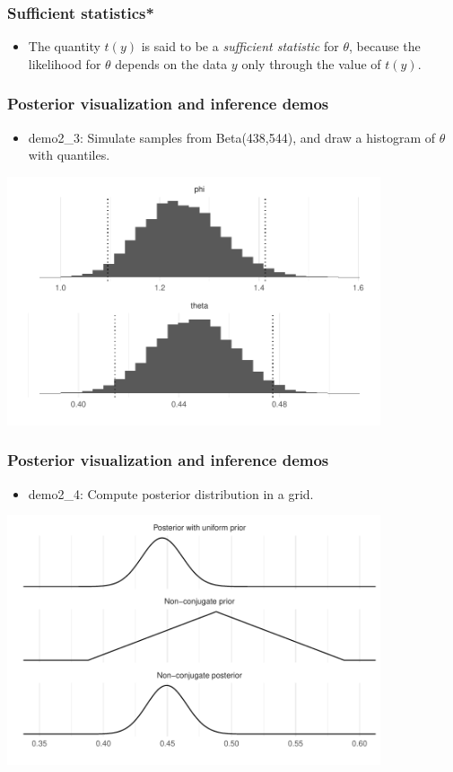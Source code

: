 \documentclass[10pt,handout]{beamer}
\begin{document}

\begin{frame}
  \frametitle{Sufficient statistics*}

  \begin{itemize}
  \item The quantity $t(y)$ is said to be a {\em sufficient statistic}
    for $\theta$, because the likelihood for $\theta$ depends on the
    data $y$ only through the value of $t(y)$.
  \end{itemize}

\end{frame}


\begin{frame}
  \frametitle{Posterior visualization and inference demos}

  \begin{itemize}
  \item demo2\_3: Simulate samples from Beta(438,544), and draw
    a histogram of $\theta$ with quantiles.
  \end{itemize}
  \vspace{-\baselineskip}
  \begin{center}
  \includegraphics[width=11cm]{figs/demo2_3.pdf}
\end{center}
\end{frame}

\begin{frame}
  \frametitle{Posterior visualization and inference demos}

  \begin{itemize}
  \item demo2\_4: Compute posterior distribution in a grid.
  \end{itemize}
  \includegraphics[width=11cm]{figs/demo2_4a.pdf}
\end{frame}
\end{document}
